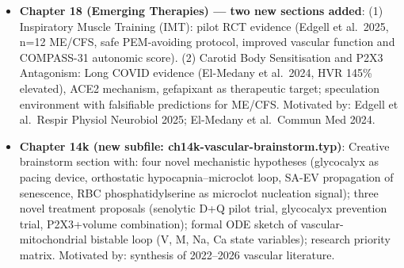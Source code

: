\begin{itemize}
\begin{itemize}
      \item \textbf{Chapter 18 (Emerging Therapies) --- two new sections added}:
        (1) Inspiratory Muscle Training (IMT): pilot RCT evidence (Edgell et al.\ 2025, n=12 ME/CFS,
        safe PEM-avoiding protocol, improved vascular function and COMPASS-31 autonomic score).
        (2) Carotid Body Sensitisation and P2X3 Antagonism: Long COVID evidence (El-Medany et al.\ 2024,
        HVR 145\% elevated), ACE2 mechanism, gefapixant as therapeutic target; speculation environment
        with falsifiable predictions for ME/CFS.
        Motivated by: Edgell et al.\ Respir Physiol Neurobiol 2025; El-Medany et al.\ Commun Med 2024.
        \cite{Edgell2025imt, ElMedany2024carotid}

      \item \textbf{Chapter 14k (new subfile: ch14k-vascular-brainstorm.typ)}:
        Creative brainstorm section with: four novel mechanistic hypotheses (glycocalyx as pacing device,
        orthostatic hypocapnia--microclot loop, SA-EV propagation of senescence, RBC phosphatidylserine
        as microclot nucleation signal); three novel treatment proposals (senolytic D+Q pilot trial,
        glycocalyx prevention trial, P2X3+volume combination); formal ODE sketch of vascular-mitochondrial
        bistable loop (V, M, Na, Ca state variables); research priority matrix.
        Motivated by: synthesis of 2022--2026 vascular literature.

    \end{itemize}


\end{itemize}
